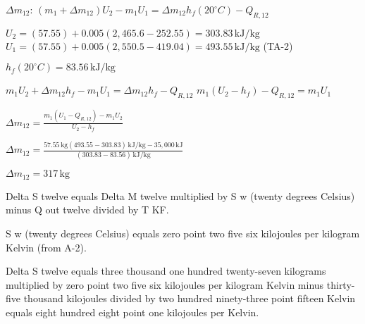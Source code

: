 \( \Delta m_{12} \):  
\( (m_1 + \Delta m_{12}) U_2 - m_1 U_1 = \Delta m_{12} h_f(20^\circ C) - Q_{R,12} \)  

\( U_2 = (57.55) + 0.005 (2,465.6 - 252.55) = 303.83 \, \text{kJ/kg} \)  
\( U_1 = (57.55) + 0.005 (2,550.5 - 419.04) = 493.55 \, \text{kJ/kg} \) (TA-2)  

\( h_f(20^\circ C) = 83.56 \, \text{kJ/kg} \)  

\( m_1 U_2 + \Delta m_{12} h_f - m_1 U_1 = \Delta m_{12} h_f - Q_{R,12} \)  
\( m_1 (U_2 - h_f) - Q_{R,12} = m_1 U_1 \)  

\( \Delta m_{12} = \frac{m_1 (U_1 - Q_{R,12}) - m_1 U_2}{U_2 - h_f} \)  

\( \Delta m_{12} = \frac{57.55 \, \text{kg} (493.55 - 303.83) \, \text{kJ/kg} - 35,000 \, \text{kJ}}{(303.83 - 83.56) \, \text{kJ/kg}} \)  

\( \Delta m_{12} = 317 \, \text{kg} \)

Delta S twelve equals Delta M twelve multiplied by S w (twenty degrees Celsius) minus Q out twelve divided by T KF.  

S w (twenty degrees Celsius) equals zero point two five six kilojoules per kilogram Kelvin (from A-2).  

Delta S twelve equals three thousand one hundred twenty-seven kilograms multiplied by zero point two five six kilojoules per kilogram Kelvin minus thirty-five thousand kilojoules divided by two hundred ninety-three point fifteen Kelvin equals eight hundred eight point one kilojoules per Kelvin.